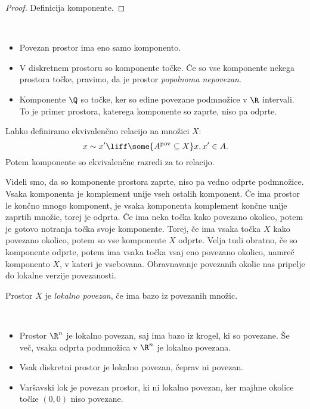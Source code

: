 \begin{proof}
    Definicija komponente.
\end{proof}

\begin{primer}
    \ 
    \begin{itemize}
        \item Povezan prostor ima eno samo komponento.
        \item V diskretnem prostoru so komponente točke. Če so vse komponente nekega prostora točke, pravimo, da je prostor \emph{popolnoma nepovezan}.
        \item Komponente $\Q$ so točke, ker so edine povezane podmnožice v $\R$ intervali. To je primer prostora, katerega komponente so zaprte, niso pa odprte.
    \end{itemize}
\end{primer}

\begin{opomba}
    Lahko definiramo ekvivalenčno relacijo na množici $X$:
    $$x \sim x' \liff \some{A^{\text{pov}} \subseteq X}x,x' \in A.$$
    Potem komponente so ekvivalenčne razredi za to relacijo.
\end{opomba}

Videli smo, da so komponente prostora zaprte, niso pa vedno odprte podmnožice. Vsaka komponenta je komplement unije vseh ostalih komponent. Če ima prostor le končno mnogo komponent, je vsaka komponenta komplement končne unije zaprtih množic, torej je odprta. Če ima neka točka kako povezano okolico, potem je gotovo notranja točka svoje komponente. Torej, če ima vsaka točka $X$ kako povezano okolico, potem so vse komponente $X$ odprte. Velja tudi obratno, če so komponente odprte, potem ima vsaka točka vsaj eno povezano okolico, namreč komponento $X$, v kateri je vsebovana. Obravnavanje povezanih okolic nas pripelje do lokalne verzije povezanosti.

\begin{definicija}
    Prostor $X$ je \emph{lokalno povezan}, če ima bazo iz povezanih množic.
\end{definicija}

\begin{primer}
    \ 
    \begin{itemize}
        \item Prostor $\R^n$ je lokalno povezan, saj ima bazo iz krogel, ki so povezane. Še več, vsaka odprta podmnožica v $\R^n$ je lokalno povezana.
        \item Vsak diskretni prostor je lokalno povezan, čeprav ni povezan.
        \item Varšavski lok je povezan prostor, ki ni lokalno povezan, ker majhne okolice točke $(0,0)$ niso povezane.
    \end{itemize}
\end{primer}

